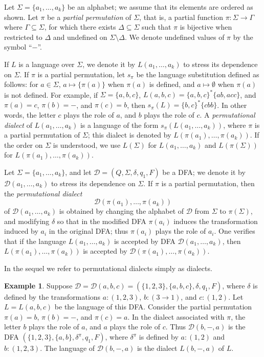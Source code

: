 \documentclass[final]{dmtcs-episciences}
\newcommand{\emp}{\emptyset}
\newcommand{\Sig}{\Sigma}
\newcommand{\cD}{{\mathcal D}}
\theoremstyle{definition}
\newtheorem{example}{Example}
\theoremstyle{remark}
\begin{document}
Let $\Sig=\{a_1,\dots,a_k\}$ be an alphabet; we assume that its elements are ordered as shown.
Let $\pi$ be a \emph{partial permutation} of $\Sig$, that is, a partial function $\pi \colon \Sig \rightarrow \Gamma$ where $\Gamma \subseteq \Sig$, for which there exists $\Delta \subseteq \Sig$ such that $\pi$ is bijective when restricted to $\Delta$ and  undefined on $\Sig \setminus \Delta$. We denote undefined values of $\pi$ by the symbol ``$-$''.

If $L$ is a language over $\Sig$, we denote it by $L(a_1,\dots,a_k)$ to stress its dependence on $\Sig$.
If $\pi$ is a partial permutation, let $s_\pi$ be the language substitution  defined as follows: 
 for $a\in \Sig$, 
$a \mapsto \{\pi(a)\}$ when $\pi(a)$ is defined, and $a \mapsto \emp$ when $\pi(a)$ is not defined.
For example, if $\Sig=\{a,b,c\}$, $L(a,b,c)=\{a,b,c\}^*\{ab, acc\}$, and $\pi(a)=c$, $\pi(b)=-$, and $\pi(c)=b$, then $s_\pi(L)= \{b,c\}^*\{cbb\}$.
In other words, the letter $c$ plays the role of $a$, and $b$ plays the role of $c$.
A \emph{permutational dialect} of $L(a_1,\dots,a_k)$ is a language of the form 
$s_\pi(L(a_1,\dots,a_k))$, where $\pi$ is a partial permutation of $\Sig$; this dialect is denoted by
$L(\pi(a_1),\dotsc,\pi(a_k))$.
If the order on $\Sig$ is understood, we use  $L(\Sig)$ for $L(a_1,\dots,a_k)$ and $L(\pi(\Sig))$
for $L(\pi(a_1),\dotsc,\pi(a_k))$.

Let $\Sig=\{a_1,\dots,a_k\}$,  and 
let $\cD = (Q,\Sig,\delta,q_1,F)$ be a DFA; we denote it by
$\cD(a_1,\dots,a_k)$ to stress its dependence on $\Sig$.
If $\pi$ is a partial permutation, then the \emph{permutational dialect} 
$$\cD(\pi(a_1),\dotsc,\pi(a_k))$$ of
$\cD(a_1,\dots,a_k)$ is obtained by changing the alphabet of $\cD$ from $\Sig$ to $\pi(\Sig)$, and modifying $\delta$ so that in the modified DFA 
$\pi(a_i)$ induces the transformation induced by $a_i$  in the original DFA; thus $\pi(a_i)$ plays the role of $a_i$.
One verifies that if the language $L(a_1,\dots,a_k)$ is accepted by DFA $\cD(a_1,\dots,a_k)$, then
$L(\pi(a_1),\dotsc,\pi(a_k))$ is accepted by $\cD(\pi(a_1),\dotsc,\pi(a_k))$.

In the sequel we refer to permutational dialects simply as dialects.

\begin{example}
Suppose $\cD = \cD(a,b,c) = (\{1,2,3\},\{a,b,c\},\delta,q_1,F)$, where  $\delta$ is defined by the transformations 
$a \colon (1,2,3)$, $b \colon (3 \rightarrow 1)$, and $c \colon (1,2)$. 
 Let $L = L(a,b,c)$ be the language of this DFA. 
Consider the partial permutation $\pi(a) = b$, $\pi(b) = -$, and $\pi(c) = a$. In the dialect associated with $\pi$, the letter $b$ plays the role of $a$, and $a$ plays the role of $c$. 
Thus $\cD(b,-,a)$
 is the DFA $(\{1,2,3\},\{a,b\},\delta^\pi,q_1,F)$, where $\delta^\pi$ is defined by 
$a \colon (1,2)$ and $b \colon (1,2,3)$.
The language of $\cD(b,-,a)$ is the dialect $L(b,-,a)$ of $L$.
\end{example}
\end{document}

